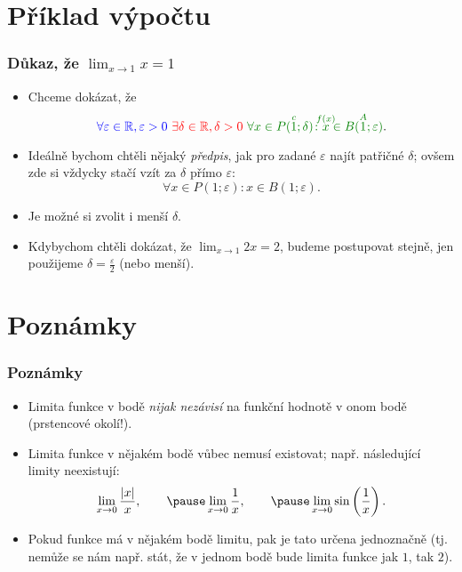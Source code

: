 \documentclass[handout]%
{beamer}
\def\rllap#1{\hbox to0pt{\hss#1\hss}}
\newcommand{\R}{\mathbb R}
\begin{document}
\section{Příklad výpočtu}


\begin{frame}
	\frametitle{Důkaz, že $\lim_{x\to1}x = 1$}
	\begin{itemize}
		\item Chceme dokázat, že
		\[ \textcolor{blue}{\forall \varepsilon \in \R, \varepsilon>0} \  \textcolor{red}{\exists \delta \in \R, \delta > 0}\  \textcolor{green!50!black}{\forall x \in P(\overset{c}{1}; \delta)\colon \overset{\rllap{$\scriptstyle f(x)$}}{x} \in B(\overset{A}{1}; \varepsilon)}.  \]
		\item Ideálně bychom chtěli nějaký \emph{předpis}, jak pro zadané $\varepsilon$ najít patřičné $\delta$; \pause ovšem zde si vždycky stačí vzít za $\delta$ přímo $\varepsilon$:
		\[ \forall x \in P(1; \varepsilon)\colon x \in B(1; \varepsilon). \]\pause
		\item Je možné si zvolit i menší $\delta$. \pause
		\item Kdybychom chtěli dokázat, že $\lim_{x\to1}2x = 2$, budeme postupovat stejně, jen použijeme $\delta = \frac{\varepsilon}{2}$ (nebo menší).
		
	\end{itemize}
	
\end{frame}


\section{Poznámky}

\begin{frame}
	\frametitle{Poznámky}
	\begin{itemize}
		\item Limita funkce v bodě \emph{nijak nezávisí} na funkční hodnotě v onom bodě \pause (prstencové okolí!).
		\item Limita funkce v nějakém bodě vůbec nemusí existovat; např. následující limity \alert{ne}existují:\pause
		\[ \lim_{x \to 0}\frac{|x|}{x}, \qquad \pause \lim_{x \to 0}\frac{1}{x}, \qquad \pause \lim_{x \to 0}\sin\left(\frac{1}{x}\right). \] \pause
		\item Pokud funkce má v nějakém bodě limitu, pak je tato určena jednoznačně (tj. nemůže se nám např. stát, že v jednom bodě bude limita funkce jak $1$, tak $2$).
	\end{itemize}
\end{frame}
\end{document}
